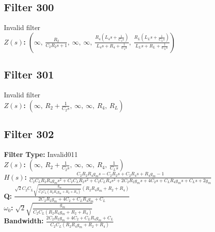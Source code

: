 \documentclass{article}
\begin{document}
\subsection*{Filter 300}
Invalid filter \\ 
\textbf{$Z(s)$:} $\left( \infty, \  \frac{R_{2}}{C_{2} R_{2} s + 1}, \  \infty, \  \infty, \  \frac{R_{4} \left(L_{4} s + \frac{1}{C_{4} s}\right)}{L_{4} s + R_{4} + \frac{1}{C_{4} s}}, \  \frac{R_{L} \left(L_{L} s + \frac{1}{C_{L} s}\right)}{L_{L} s + R_{L} + \frac{1}{C_{L} s}}\right)$ \\ 
\subsection*{Filter 301}
Invalid filter \\ 
\textbf{$Z(s)$:} $\left( \infty, \  R_{2} + \frac{1}{C_{2} s}, \  \infty, \  \infty, \  R_{4}, \  R_{L}\right)$ \\ 
\subsection*{Filter 302}
\textbf{Filter Type:} Invalid011 \\ 
\textbf{$Z(s)$:} $\left( \infty, \  R_{2} + \frac{1}{C_{2} s}, \  \infty, \  \infty, \  R_{4}, \  \frac{1}{C_{L} s}\right)$ \\ 
\textbf{$H(s)$:} $\frac{C_{2} R_{2} R_{4} g_{m} s - C_{2} R_{2} s + C_{2} R_{4} s + R_{4} g_{m} - 1}{C_{2} C_{L} R_{2} R_{4} g_{m} s^{2} + C_{2} C_{L} R_{2} s^{2} + C_{2} C_{L} R_{4} s^{2} + 2 C_{2} R_{2} g_{m} s + 4 C_{2} s + C_{L} R_{4} g_{m} s + C_{L} s + 2 g_{m}}$ \\ 
\textbf{Q:} $\frac{\sqrt{2} C_{2} C_{L} \sqrt{\frac{g_{m}}{C_{2} C_{L} \left(R_{2} R_{4} g_{m} + R_{2} + R_{4}\right)}} \left(R_{2} R_{4} g_{m} + R_{2} + R_{4}\right)}{2 C_{2} R_{2} g_{m} + 4 C_{2} + C_{L} R_{4} g_{m} + C_{L}}$ \\ 
\textbf{$\omega_0$:} $\sqrt{2} \sqrt{\frac{g_{m}}{C_{2} C_{L} \left(R_{2} R_{4} g_{m} + R_{2} + R_{4}\right)}}$ \\ 
\textbf{Bandwidth:} $\frac{2 C_{2} R_{2} g_{m} + 4 C_{2} + C_{L} R_{4} g_{m} + C_{L}}{C_{2} C_{L} \left(R_{2} R_{4} g_{m} + R_{2} + R_{4}\right)}$ \\ 
\end{document}
